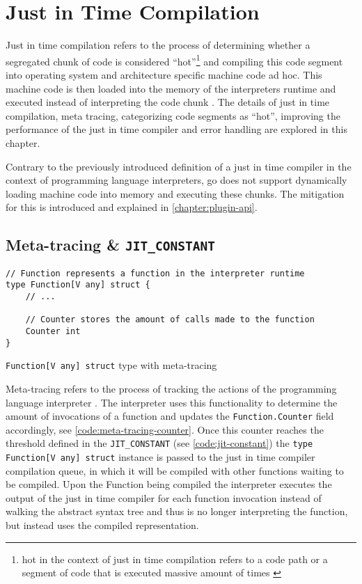 \chapter{Just in Time Compilation}

Just in time compilation refers to the process of determining whether a
segregated chunk of code is considered ``hot''\footnote{hot in the context of
just in time compilation refers to a code path or a segment of code that is
executed massive amount of times \cite{jvm_ibm_optlevel, jvm_efficient}} and
compiling this code segment into operating system and architecture specific
machine code ad hoc. This machine code is then loaded into the memory of the
interpreters runtime and executed instead of interpreting the code chunk
\cite{jvm_efficient}. The details of just in time compilation, meta tracing,
categorizing code segments as ``hot'', improving the performance of the just in
time compiler and error handling are explored in this chapter.

Contrary to the previously introduced definition of a just in time
compiler in the context of programming language interpreters, go does
not support dynamically loading machine code into memory and executing
these chunks. The mitigation for this is introduced and explained in
\autoref{chapter:plugin-api}.

\section{Meta-tracing \& \texttt{JIT\_CONSTANT}}
\label{sec:meta-tracing-jit-constant}

\begin{listing}[H]
    \begin{verbatim}
// Function represents a function in the interpreter runtime
type Function[V any] struct {
    // ...

    // Counter stores the amount of calls made to the function
    Counter int
}
    \end{verbatim}
    \caption{\texttt{Function[V any] struct} type with meta-tracing}
    \label{code:meta-tracing-counter}
\end{listing}

Meta-tracing refers to the process of tracking the actions of the programming
language interpreter \cite[4.1 Meta-tracing]{bolz2015impact}. The interpreter
uses this functionality to determine the amount of invocations of a function
and updates the \texttt{Function.Counter} field accordingly, see
\autoref{code:meta-tracing-counter}. Once this counter reaches the threshold
defined in the \texttt{JIT\_CONSTANT} (see \autoref{code:jit-constant}) the
\texttt{type Function[V any] struct} instance is passed to the just in
time compiler compilation queue, in which it will be compiled with other
functions waiting to be compiled. Upon the Function being compiled the
interpreter executes the output of the just in time compiler for each function
invocation instead of walking the abstract syntax tree and thus is no longer
interpreting the function, but instead uses the compiled representation.

